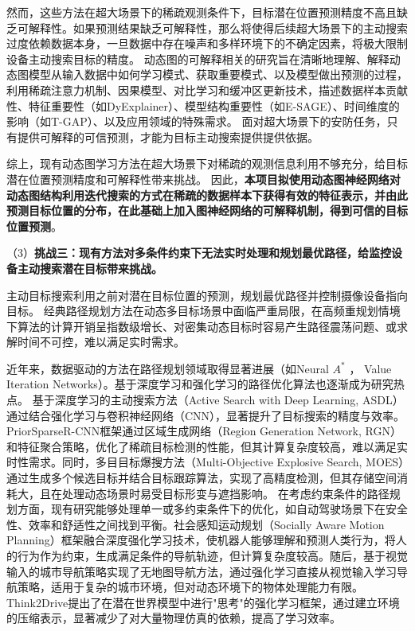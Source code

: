 然而，这些方法在超大场景下的稀疏观测条件下，目标潜在位置预测精度不高且缺乏可解释性。如果预测结果缺乏可解释性，那么将使得后续超大场景下的主动搜索过度依赖数据本身，一旦数据中存在噪声和多样环境下的不确定因素，将极大限制设备主动搜索目标的精度。
动态图的可解释相关的研究旨在清晰地理解、解释动态图模型从输入数据中如何学习模式、获取重要模式、以及模型做出预测的过程，利用稀疏注意力机制、因果模型\cite{zhao2024causality}、对比学习\cite{wang2024dyexplainer}和缓冲区更新技术，描述数据样本贡献性\cite{DBLP:conf/iclr/ChenLLH23}、特征重要性（如DyExplainer\cite{wang2024dyexplainer}）、模型结构重要性（如E-SAGE\cite{wang2024esage}）、时间维度的影响（如T-GAP\cite{jung2021learning}）、以及应用领域的特殊需求。
面对超大场景下的安防任务，只有提供可解释的可信预测，才能为目标主动搜索提供提供依据。

综上，现有动态图学习方法在超大场景下对稀疏的观测信息利用不够充分，给目标潜在位置预测精度和可解释性带来挑战。
因此，\textbf{本项目拟使用动态图神经网络对动态图结构利用迭代搜索的方式在稀疏的数据样本下获得有效的特征表示，并由此预测目标位置的分布，在此基础上加入图神经网络的可解释机制，得到可信的目标位置预测}。


（3）\textbf{挑战三：现有方法对多条件约束下无法实时处理和规划最优路径，给监控设备主动搜索潜在目标带来挑战。}

主动目标搜索利用之前对潜在目标位置的预测，规划最优路径并控制摄像设备指向目标。
经典路径规划方法在动态多目标场景中面临严重局限，在高频重规划情境下算法的计算开销呈指数级增长\cite{bhardwaj2017learningheuristicsearchimitation}、对密集动态目标时容易产生路径震荡问题\cite{9154607}、或求解时间不可控\cite{10.1145/3272127.3275109}，难以满足实时需求。

近年来，数据驱动的方法在路径规划领域取得显著进展（如Neural $A^{\ast}$ \cite{Archetti_2022}， Value Iteration Networks\cite{tamar2017valueiterationnetworks}）。基于深度学习和强化学习的路径优化算法也逐渐成为研究热点\cite{zheng2023distributed,cui2024multi,fang2024improved}。
基于深度学习的主动搜索方法\cite{DBLP:conf/iclr/HottungKT22}（Active Search with Deep Learning, ASDL）通过结合强化学习与卷积神经网络（CNN），显著提升了目标搜索的精度与效率。
PriorSparseR-CNN框架\cite{wang2024priorsparse}通过区域生成网络（Region Generation Network, RGN）和特征聚合策略，优化了稀疏目标检测的性能，但其计算复杂度较高，难以满足实时性需求。同时，多目目标爆搜方法（Multi-Objective Explosive Search, MOES）\cite{moes2024}通过生成多个候选目标并结合目标跟踪算法，实现了高精度检测，但其存储空间消耗大，且在处理动态场景时易受目标形变与遮挡影响。
在考虑约束条件的路径规划方面，现有研究能够处理单一或多约束条件下的优化，如自动驾驶场景下在安全性、效率和舒适性之间找到平衡\cite{yang2019generalizedalgorithmmultiobjectivereinforcement}。社会感知运动规划\cite{DBLP:conf/iros/ChenELH17}（Socially Aware Motion Planning）框架融合深度强化学习技术，使机器人能够理解和预测人类行为，将人的行为作为约束，生成满足条件的导航轨迹，但计算复杂度较高。随后，基于视觉输入的城市导航策略\cite{mirowski2019learningnavigatecitiesmap}实现了无地图导航方法，通过强化学习直接从视觉输入学习导航策略，适用于复杂的城市环境，但对动态环境下的物体处理能力有限。
Think2Drive\cite{li2024think2driveefficientreinforcementlearning}提出了在潜在世界模型中进行"思考"的强化学习框架，通过建立环境的压缩表示，显著减少了对大量物理仿真的依赖，提高了学习效率。

